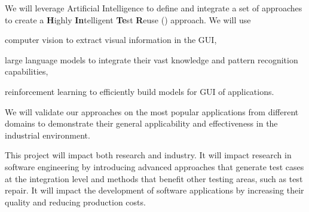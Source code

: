 
We will leverage Artificial Intelligence to define and integrate a set of \testreuse approaches to create a  \textbf{H}ighly \textbf{In}telligent \textbf{Te}st \textbf{R}euse (\project) approach.
We will use 
\begin{inparaenum}[(i)]
\item computer vision to extract visual information in the GUI,
\item  large language models to integrate their vast knowledge and pattern recognition capabilities,
\item reinforcement learning to efficiently build models for  GUI of applications.
\end{inparaenum}
We will validate our approaches on the most popular applications from different domains to demonstrate their general applicability and effectiveness in the industrial environment.



This project will impact both research and industry. 
It will impact research in software engineering by introducing advanced approaches that generate test cases at the integration level and methods that benefit other testing areas, such as test repair. 
It will impact the development of software applications by increasing their quality and reducing production costs.
 



























